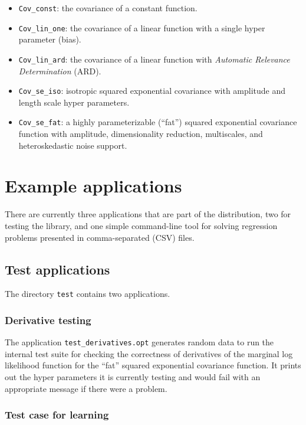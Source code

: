 \documentclass[10pt]{report}
\begin{document}
\begin{itemize}
\item \verb=Cov_const=: the covariance of a constant function.
\item \verb=Cov_lin_one=: the covariance of a linear function with a single
hyper parameter (bias).
\item \verb=Cov_lin_ard=: the covariance of a linear function with
\emph{Automatic Relevance Determination} (ARD).
\item \verb=Cov_se_iso=: isotropic squared exponential covariance with amplitude
and length scale hyper parameters.
\item \verb=Cov_se_fat=: a highly parameterizable (``fat'') squared exponential
covariance function with amplitude, dimensionality reduction, multiscales, and
heteroskedastic noise support.
\end{itemize}

\chapter{Example applications}

There are currently three applications that are part of the distribution, two
for testing the library, and one simple command-line tool for solving regression
problems presented in comma-separated (CSV) files.

\section{Test applications}

The directory \verb=test= contains two applications.

\subsection{Derivative testing}

The application \verb=test_derivatives.opt= generates random data to run the
internal test suite for checking the correctness of derivatives of the marginal
log likelihood function for the ``fat'' squared exponential covariance function.
It prints out the hyper parameters it is currently testing and would fail with
an appropriate message if there were a problem.

\subsection{Test case for learning}
\end{document}
